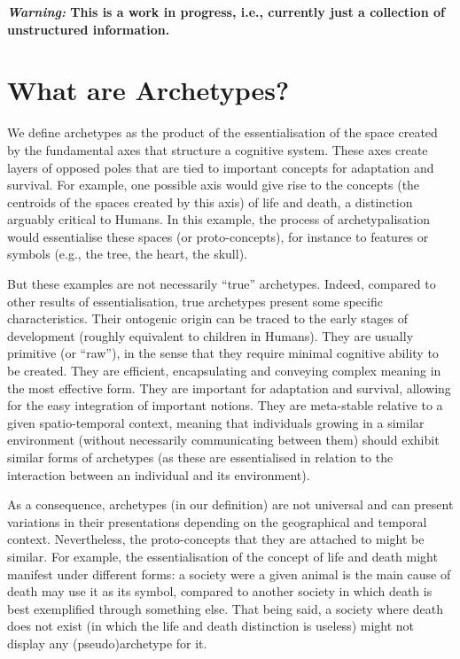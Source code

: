 \documentclass[
]{book}
\begin{document}
\textbf{\emph{Warning:} This is a work in progress, i.e., currently just a collection of unstructured information.}

\hypertarget{what-are-archetypes}{%
\section{What are Archetypes?}\label{what-are-archetypes}}

We define archetypes as the product of the essentialisation of the space created by the fundamental axes that structure a cognitive system. These axes create layers of opposed poles that are tied to important concepts for adaptation and survival. For example, one possible axis would give rise to the concepts (the centroids of the spaces created by this axis) of life and death, a distinction arguably critical to Humans. In this example, the process of archetypalisation would essentialise these spaces (or proto-concepts), for instance to features or symbols (e.g., the tree, the heart, the skull).

But these examples are not necessarily ``true'' archetypes. Indeed, compared to other results of essentialisation, true archetypes present some specific characteristics. Their ontogenic origin can be traced to the early stages of development (roughly equivalent to children in Humans). They are usually primitive (or ``raw''), in the sense that they require minimal cognitive ability to be created. They are efficient, encapsulating and conveying complex meaning in the most effective form. They are important for adaptation and survival, allowing for the easy integration of important notions. They are meta-stable relative to a given spatio-temporal context, meaning that individuals growing in a similar environment (without necessarily communicating between them) should exhibit similar forms of archetypes (as these are essentialised in relation to the interaction between an individual and its environment).

As a consequence, archetypes (in our definition) are not universal and can present variations in their presentations depending on the geographical and temporal context. Nevertheless, the proto-concepts that they are attached to might be similar. For example, the essentialisation of the concept of life and death might manifest under different forms: a society were a given animal is the main cause of death may use it as its symbol, compared to another society in which death is best exemplified through something else. That being said, a society where death does not exist (in which the life and death distinction is useless) might not display any (pseudo)archetype for it.
\end{document}

